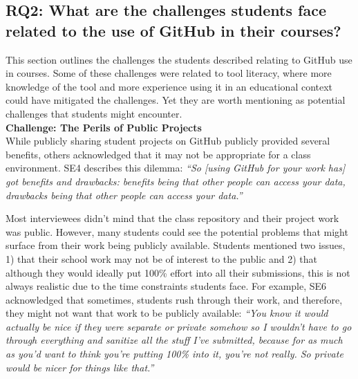 \subsection{RQ2: What are the challenges students face related to the use of GitHub in their courses?}
This section outlines the challenges the students described relating to GitHub use in courses. Some of these challenges were related to tool literacy, where more knowledge of the tool and more experience using it in an educational context could have mitigated the challenges. Yet they are worth mentioning as potential challenges that students might encounter. \\

\textbf{Challenge: The Perils of Public Projects} \\
While publicly sharing student projects on GitHub publicly provided several benefits, others acknowledged that it may not be appropriate for a class environment. SE4 describes this dilemma: \textit{``So [using GitHub for your work has] got benefits and drawbacks: benefits being that other people can access your data, drawbacks being that other people can access your data.''}

Most interviewees didn't mind that the class repository and their project work was public. However, many students could see the potential problems that might surface from their work being publicly available. Students mentioned two issues, 1) that their school work may not be of interest to the public and 2) that although they would ideally put 100\% effort into all their submissions, this is not always realistic due to the time constraints students face. For example, SE6 acknowledged that sometimes, students rush through their work, and therefore, they might not want that work to be publicly available: \textit{``You know it would actually be nice if they were separate or private somehow so I wouldn't have to go through everything and sanitize all the stuff I've submitted, because for as much as you'd want to think you're putting 100\% into it, you're not really. So private would be nicer for things like that.''}

